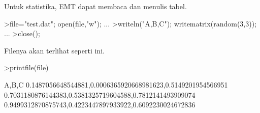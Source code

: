 \documentclass{article}
\begin{document}
\begin{eulernotebook}
\begin{eulercomment}
\begin{eulercomment}
\begin{eulercomment}
Untuk statistika, EMT dapat membaca dan menulis tabel.
\end{eulercomment}
\begin{eulerprompt}
>file="test.dat"; open(file,"w"); ...
>writeln("A,B,C"); writematrix(random(3,3)); ...
>close();
\end{eulerprompt}
\begin{eulercomment}
Filenya akan terlihat seperti ini.
\end{eulercomment}
\begin{eulerprompt}
>printfile(file)
\end{eulerprompt}
\begin{euleroutput}
  A,B,C
  0.1487056648544881,0.0006365920668981623,0.5149201954566951
  0.7031180876144383,0.5381325719604588,0.7812141493909074
  0.9499312870875743,0.4223447897933922,0.6092230024672836
  

\end{euleroutput}
\end{eulercomment}
\end{eulercomment}
\end{eulernotebook}
\end{document}
